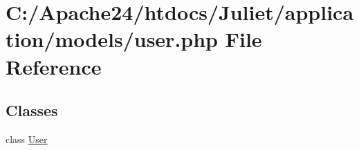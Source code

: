 \hypertarget{user_8php}{\section{C\-:/\-Apache24/htdocs/\-Juliet/application/models/user.php File Reference}
\label{user_8php}
}
\subsection*{Classes}
\begin{DoxyCompactItemize}
\item 
class \hyperlink{class_user}{User}
\end{DoxyCompactItemize}
